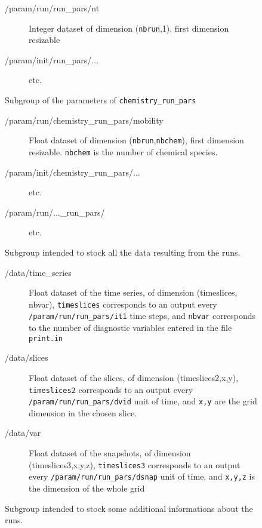 \documentclass[a4paper,12pt]{article}
\begin{document}
\begin{figure}[p]
{\begin{description}
\begin{description}
\begin{description}
\begin{description}
\begin{description}
        \item[/param/run/run\_pars/nt] Integer dataset of
            dimension (\texttt{nbrun},1), first dimension resizable
        \item[/param/init/run\_pars/...] etc.
        \end{description}
      \item[/param/run/chemistry\_run\_pars/] Subgroup of the
        parameters of \texttt{chemistry\_run\_pars} 
        \begin{description}
        \item[/param/run/chemistry\_run\_pars/mobility] Float dataset of
            dimension (\texttt{nbrun},\texttt{nbchem}), first
            dimension resizable. \texttt{nbchem} is the number of
            chemical species.
        \item[/param/init/chemistry\_run\_pars/...] etc.
      \item[/param/run/...\_run\_pars/] etc.
        \end{description}
      \end{description}
    \end{description}
  \item[/data/] Subgroup intended to stock all the data resulting from
    the runs.
    \begin{description}
    \item[/data/time\_series] Float dataset of the time series, of
      dimension (timeslices, nbvar),  \texttt{timeslices} corresponds
      to an output every \texttt{/param/run/run\_pars/it1} time
      steps, and \texttt{nbvar} corresponds to the number of
      diagnostic variables entered in the file \texttt{print.in}
    \item[/data/slices] Float dataset of the slices, of dimension
      (timeslices2,x,y), \texttt{timeslices2} corresponds to an output
      every \texttt{/param/run/run\_pars/dvid} unit of time, and
      \texttt{x,y} are the grid dimension in the chosen slice.
    \item[/data/var] Float dataset of the snapshots, of dimension
      (timeslices3,x,y,z), \texttt{timeslices3} corresponds to an
      output every  \texttt{/param/run/run\_pars/dsnap} unit of time,
      and \texttt{x,y,z} is the dimension of the whole grid
    \end{description}
  \item[/notes/] Subgroup intended to stock some additional
    informations about the runs.
    \begin{description}

\end{description}
\end{description}
\end{description}}
\end{figure}
\end{document}

